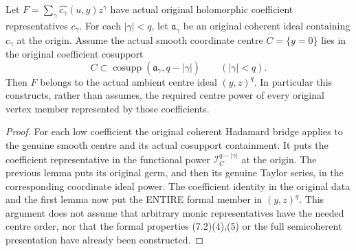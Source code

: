 \begin{theorem}
\label{hir:actual-coefficient-presentation-cosupport-centre-power}
\leanok
Let $F=\sum_\gamma\widehat{c_\gamma}(u,y)z^\gamma$ have actual original
holomorphic coefficient representatives $c_\gamma$. For each
$|\gamma|<q$, let $\mathfrak a_\gamma$ be an original coherent ideal
containing $c_\gamma$ at the origin. Assume the actual smooth coordinate
centre $C=\{y=0\}$ lies in the original coefficient cosupport
\[
 C\subset\operatorname{cosupp}(\mathfrak a_\gamma,q-|\gamma|)
 \qquad (|\gamma|<q).
\]
Then $F$ belongs to the actual ambient centre ideal $(y,z)^q$.
In particular this constructs, rather than assumes, the required centre
power of every original vertex member represented by those coefficients.
\end{theorem}
\begin{proof}
For each low coefficient the original coherent Hadamard bridge applies
to the genuine smooth centre and its actual cosupport containment. It
puts the coefficient representative in the functional power
$\mathcal I_C^{q-|\gamma|}$ at the origin. The previous lemma puts its
original germ, and then its genuine Taylor series, in the corresponding
coordinate ideal power. The coefficient identity in the original data
and the first lemma now put the ENTIRE formal member in $(y,z)^q$.
This argument does not assume that arbitrary monic representatives have
the needed centre order, nor that the formal properties (7.2)(4),(5) or
the full semicoherent presentation have already been constructed.
\end{proof}
